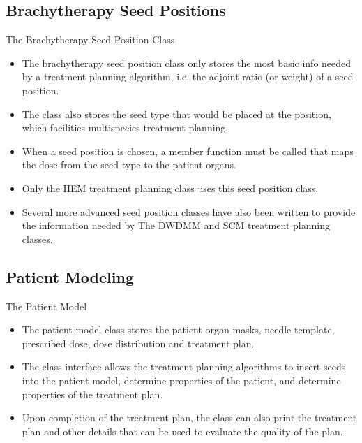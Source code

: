 \documentclass{beamer}
\begin{document}
\subsection{Brachytherapy Seed Positions}
\begin{frame}{The Brachytherapy Seed Position Class}

  \begin{itemize}
    \item The brachytherapy seed position class only stores the most basic
      info needed by a treatment planning algorithm, i.e. the adjoint ratio
      (or weight) of a seed position. 
      \medskip
    \item The class also stores the seed type that would be placed at the 
      position, which facilities multispecies treatment planning.
      \medskip
    \item When a seed position is chosen, a member function must be called that
      maps the dose from the seed type to the patient organs.
      \medskip
    \item Only the IIEM treatment planning class uses this seed position class.
      \medskip
    \item Several more advanced seed position classes have also been written
      to provide the information needed by The DWDMM and SCM treatment planning
      classes.
  \end{itemize}
  
\end{frame}

\subsection{Patient Modeling}
\begin{frame}{The Patient Model}
  
  \begin{itemize}
    \item The patient model class stores the patient organ masks,
      needle template, prescribed dose, dose distribution and treatment plan.
      \medskip
    \item The class interface allows the treatment planning algorithms to 
      insert seeds into the patient model, determine properties of the 
      patient, and determine properties of the treatment plan.
      \medskip
    \item Upon completion of the treatment plan, the class can also print
      the treatment plan and other details that can be used to evaluate the
      quality of the plan.
  \end{itemize}
  
\end{frame}
\end{document}
